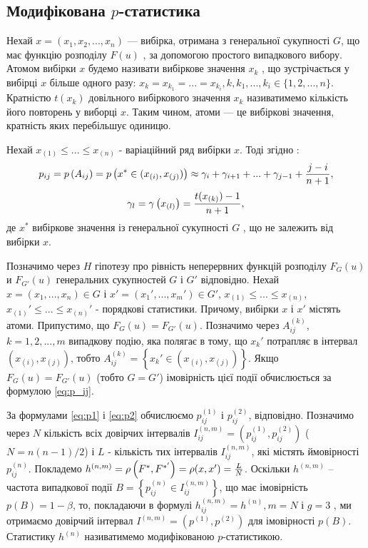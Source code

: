\documentclass[14pt,a4paper,titlepage]{extarticle}
\begin{document}
\subsection{Модифікована $p$-статистика}
Нехай $x=(x_1, x_2,...,x_n)$ — вибірка, отримана з генеральної
сукупності $G$, що має функцію розподілу $F(u)$ , за допомогою простого
випадкового вибору. Атомом вибірки $x$ будемо називати вибіркове
значення $x_k$ , що зустрічається у вибірці $x$ більше одного разу:
$x_k=x_{k_1}=...=x_{k_i}, k,k_1,...,k_i \in \{1,2,...,n\}$.
Кратністю $t(x_k)$ довільного
вибіркового значення $x_k$ називатимемо кількість його повторень у
виборці $x$. Таким чином, атоми — це вибіркові значення, кратність яких
перебільшує одиницю. \par
Нехай $x_{(1)}\leq ... \leq x_{(n)}$ - варіаційний ряд вибірки $x$.
Тоді згідно \cite{l7}:
\begin{equation}\label{eq:p_ij}
p_{ij}=p\left(A_{ij}\right)=p\left(x^{*} \in (x_{(i)}, x_{(j)})\right) \approx
\gamma_i + \gamma_{i+1} + ... + \gamma_{j-1} + {{j-i}\over{n+1}},
\end{equation}
\[\gamma_{l} = \gamma \left(x_{(l)}\right) = {{t(x_{(k)})-1}\over{n+1}},\]
де $x^{*}$ вибіркове значення із генеральної сукупності $G$ , що не
залежить від вибірки $x$.\par

Позначимо через $H$ гіпотезу про рівність неперервних функцій
розподілу  $F_G(u)$ и $F_{G'}(u)$ генеральних сукупностей $G$ і $G'$ відповідно.
Нехай $x=(x_1,...,x_n)\in G$ і $x'=(x_1',...,x_m')\in G'$, $x_{(1)} \leq ... \leq x_{(n)}$, $x_{(1)}' \leq ... \leq x_{(n)}'$ - порядкові статистики.
Причому, вибірки $x$ і $x'$ містять атоми.
Припустимо, що $F_G(u) = F_{G'}(u)$. Позначимо через $A_{ij}^{(k)}$, $k=1,2,..., m$
випадкову подію, яка полягає в тому, що $x_k'$ потрапляє в інтервал  $\left(x_{(i)},x_{(j)}\right)$,
тобто $A_{ij}^{(k)} = \left\{x_k' \in \left(x_{(i)}, x_{(j)}\right)\right\}$. Якщо $F_G(u) = F_{G'}(u)$ (тобто $G = G'$) імовірність
цієї події обчислюється за формулою \ref{eq:p_ij}.\par
За формулами \ref{eq:p1} і \ref{eq:p2} обчислюємо $p_{ij}^{(1)}$ і $p_{ij}^{(2)}$, відповідно.
Позначимо через $N$ кількість всіх довірчих інтервалів
$I_{ij}^{(n,m)} = \left(p_{ij}^{(1)},p_{ij}^{(2)}\right)$ ($N=n(n-1)/2$) і $L$ -
кількість тих інтервалів $I_{ij}^{(n,m)}$, які містять ймовірності $p_{ij}^{(n)}$. Покладемо $h^{(n,m)}=\rho \left(F^{*},{F^{*'}}\right) = \rho(x,x') = {L\over{N}}$.
Оскільки $h^{(n,m)}$ –
частота випадкової події $B=\left\{p_{ij}^{(n)} \in I_{ij}^{(n,m)}\right\}$, що має імовірність $p(B)=1-\beta$,
то, покладаючи в формулі $h_{ij}^{(n,m)} = h^{(n)}, m = N$ і $g=3$ , ми отримаємо
довірчий інтервал $I^{(n,m)} = \left(p^{(1)},p^{(2)}\right)$ для імовірності
$p(B)$. Статистику $h^{(n)}$ називатимемо модифікованою $p$-статистикою.
\end{document}
